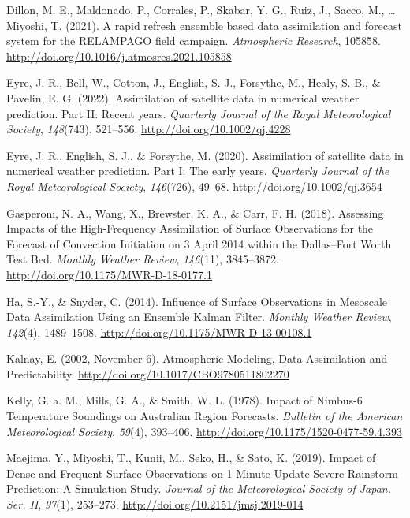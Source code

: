 \documentclass[12pt,twoside]{reedthesis}
\begin{document}
\leavevmode\hypertarget{ref-dillon2021}{}%
Dillon, M. E., Maldonado, P., Corrales, P., Skabar, Y. G., Ruiz, J., Sacco, M., \ldots{} Miyoshi, T. (2021). A rapid refresh ensemble based data assimilation and forecast system for the RELAMPAGO field campaign. \emph{Atmospheric Research}, 105858. \url{http://doi.org/10.1016/j.atmosres.2021.105858}

\leavevmode\hypertarget{ref-eyre2022}{}%
Eyre, J. R., Bell, W., Cotton, J., English, S. J., Forsythe, M., Healy, S. B., \& Pavelin, E. G. (2022). Assimilation of satellite data in numerical weather prediction. Part II: Recent years. \emph{Quarterly Journal of the Royal Meteorological Society}, \emph{148}(743), 521--556. \url{http://doi.org/10.1002/qj.4228}

\leavevmode\hypertarget{ref-eyre2020}{}%
Eyre, J. R., English, S. J., \& Forsythe, M. (2020). Assimilation of satellite data in numerical weather prediction. Part I: The early years. \emph{Quarterly Journal of the Royal Meteorological Society}, \emph{146}(726), 49--68. \url{http://doi.org/10.1002/qj.3654}

\leavevmode\hypertarget{ref-gasperoni2018}{}%
Gasperoni, N. A., Wang, X., Brewster, K. A., \& Carr, F. H. (2018). Assessing Impacts of the High-Frequency Assimilation of Surface Observations for the Forecast of Convection Initiation on 3 April 2014 within the Dallas--Fort Worth Test Bed. \emph{Monthly Weather Review}, \emph{146}(11), 3845--3872. \url{http://doi.org/10.1175/MWR-D-18-0177.1}

\leavevmode\hypertarget{ref-ha2014}{}%
Ha, S.-Y., \& Snyder, C. (2014). Influence of Surface Observations in Mesoscale Data Assimilation Using an Ensemble Kalman Filter. \emph{Monthly Weather Review}, \emph{142}(4), 1489--1508. \url{http://doi.org/10.1175/MWR-D-13-00108.1}

\leavevmode\hypertarget{ref-kalnay2002}{}%
Kalnay, E. (2002, November 6). Atmospheric Modeling, Data Assimilation and Predictability. \url{http://doi.org/10.1017/CBO9780511802270}

\leavevmode\hypertarget{ref-kelly1978}{}%
Kelly, G. a. M., Mills, G. A., \& Smith, W. L. (1978). Impact of Nimbus-6 Temperature Soundings on Australian Region Forecasts. \emph{Bulletin of the American Meteorological Society}, \emph{59}(4), 393--406. \url{http://doi.org/10.1175/1520-0477-59.4.393}

\leavevmode\hypertarget{ref-maejima2019}{}%
Maejima, Y., Miyoshi, T., Kunii, M., Seko, H., \& Sato, K. (2019). Impact of Dense and Frequent Surface Observations on 1-Minute-Update Severe Rainstorm Prediction: A Simulation Study. \emph{Journal of the Meteorological Society of Japan. Ser. II}, \emph{97}(1), 253--273. \url{http://doi.org/10.2151/jmsj.2019-014}
\end{document}
